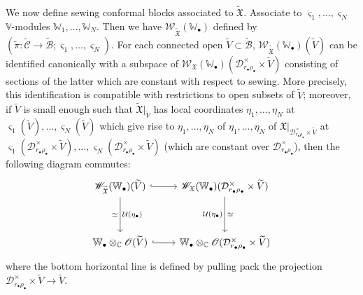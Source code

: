 \documentclass[12pt,a4paper,notitlepage]{article}
\theoremstyle{definition}
\theoremstyle{plain}
\newcommand{\fk}{\mathfrak}
\newcommand{\mc}{\mathcal}
\newcommand{\wtd}{\widetilde}
\newcommand{\scr}{\mathscr}
\newcommand{\sgm}{\varsigma}
\newcommand{\blt}{\bullet}
\newcommand{\Vbb}{\mathbb V}
\newcommand{\Wbb}{\mathbb W}
\newcommand{\Cbb}{\mathbb C}
\numberwithin{equation}{section}
\begin{document}
	
We now define sewing conformal blocks associated to $\wtd{\fk X}$. Associate to $\sgm_1,\dots,\sgm_N$  $\Vbb$-modules $\Wbb_1,\dots,\Wbb_N$. Then we have $\scr W_{\wtd{\fk X}}(\Wbb_\blt)$ defined by $(\wtd\pi:\wtd{\mc C}\rightarrow\wtd{\mc B};\sgm_1,\dots,\sgm_N)$. For each connected open $\wtd V\subset\wtd{\mc B}$, $\scr W_{\wtd{\fk X}}(\Wbb_\blt)(\wtd V)$ can be identified canonically with a subspace of $\scr W_{\fk X}(\Wbb_\blt)(\mc D_{r_\blt\rho_\blt}^\times\times\wtd V)$ consisting of sections of the latter which are constant with respect to sewing. More precisely, this identification is compatible with restrictions to open subsets of $\wtd V$; moreover, if $\wtd V$ is small enough such that $\wtd{\fk X}|_{\wtd V}$ has local coordinates $\eta_1,\dots,\eta_N$ at $\sgm_1(\wtd V),\dots,\sgm_N(\wtd V)$ which give rise to $\eta_1,\dots,\eta_N$ of $\eta_1,\dots,\eta_N$ of $\fk X|_{\mc D_{r_\blt\rho_\blt}^\times\times\wtd V}$ at $\sgm_1(\mc D_{r_\blt\rho_\blt}^\times\times\wtd V),\dots,\sgm_N(\mc D_{r_\blt\rho_\blt}^\times\times\wtd V)$ (which are constant over $\mc D_{r_\blt\rho_\blt}^\times$), then the following diagram commutes:
\begin{equation}\label{eq28}
\begin{tikzcd}
\scr W_{\wtd{\fk X}}(\Wbb_\blt)(\wtd V) \arrow[r,hook] \arrow[dd,"\simeq"',"\mc U(\eta_\blt)"] &\scr W_{\fk X}(\Wbb_\blt)(\mc D_{r_\blt\rho_\blt}^\times\times\wtd V)\arrow[dd,"\simeq","\mc U(\eta_\blt)"']\\\\
\Wbb_\blt\otimes_\Cbb\scr O(\wtd V) \arrow[r,hook]&\Wbb_\blt\otimes_\Cbb\scr O(\mc D_{r_\blt\rho_\blt}^\times\times\wtd V)
\end{tikzcd}	
\end{equation}
where the bottom horizontal line is defined by pulling pack the projection $\mc D_{r_\blt\rho_\blt}^\times\times\wtd V\rightarrow\wtd V$.
\end{document}
